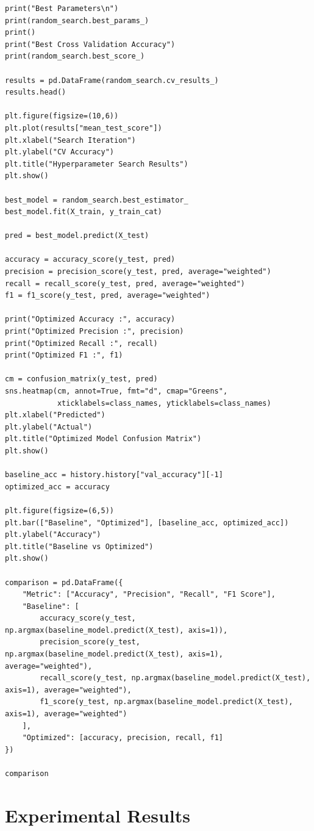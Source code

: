 \documentclass[11pt]{article}
\begin{document}
\begin{lstlisting}
print("Best Parameters\n")
print(random_search.best_params_)
print()
print("Best Cross Validation Accuracy")
print(random_search.best_score_)

results = pd.DataFrame(random_search.cv_results_)
results.head()

plt.figure(figsize=(10,6))
plt.plot(results["mean_test_score"])
plt.xlabel("Search Iteration")
plt.ylabel("CV Accuracy")
plt.title("Hyperparameter Search Results")
plt.show()

best_model = random_search.best_estimator_
best_model.fit(X_train, y_train_cat)

pred = best_model.predict(X_test)

accuracy = accuracy_score(y_test, pred)
precision = precision_score(y_test, pred, average="weighted")
recall = recall_score(y_test, pred, average="weighted")
f1 = f1_score(y_test, pred, average="weighted")

print("Optimized Accuracy :", accuracy)
print("Optimized Precision :", precision)
print("Optimized Recall :", recall)
print("Optimized F1 :", f1)

cm = confusion_matrix(y_test, pred)
sns.heatmap(cm, annot=True, fmt="d", cmap="Greens",
            xticklabels=class_names, yticklabels=class_names)
plt.xlabel("Predicted")
plt.ylabel("Actual")
plt.title("Optimized Model Confusion Matrix")
plt.show()

baseline_acc = history.history["val_accuracy"][-1]
optimized_acc = accuracy

plt.figure(figsize=(6,5))
plt.bar(["Baseline", "Optimized"], [baseline_acc, optimized_acc])
plt.ylabel("Accuracy")
plt.title("Baseline vs Optimized")
plt.show()

comparison = pd.DataFrame({
    "Metric": ["Accuracy", "Precision", "Recall", "F1 Score"],
    "Baseline": [
        accuracy_score(y_test, np.argmax(baseline_model.predict(X_test), axis=1)),
        precision_score(y_test, np.argmax(baseline_model.predict(X_test), axis=1), average="weighted"),
        recall_score(y_test, np.argmax(baseline_model.predict(X_test), axis=1), average="weighted"),
        f1_score(y_test, np.argmax(baseline_model.predict(X_test), axis=1), average="weighted")
    ],
    "Optimized": [accuracy, precision, recall, f1]
})

comparison
\end{lstlisting}

\section{Experimental Results}
\end{document}
